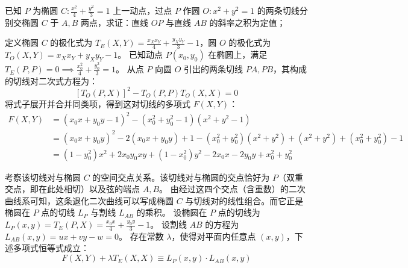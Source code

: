\begin{exercise}
    已知 \(P\) 为椭圆 \(C: \frac{x^2}{4} + \frac{y^2}{3} = 1\) 上一动点，过点 \(P\) 作圆 \(O: x^2 + y^2 = 1\) 的两条切线分别交椭圆 \(C\) 于 \(A,B\) 两点，求证：直线 \(OP\) 与直线 \(AB\) 的斜率之积为定值；
\end{exercise}
\begin{solution}
定义椭圆 $C$ 的极化式为 $T_E(X,Y) = \frac{x_X x_Y}{4} + \frac{y_X y_Y}{3} - 1$，圆 $O$ 的极化式为 $T_O(X,Y) = x_X x_Y + y_X y_Y - 1$。
已知动点 $P(x_0, y_0)$ 在椭圆上，满足 $T_E(P,P) = 0 \implies \frac{x_0^2}{4} + \frac{y_0^2}{3} = 1$。
从点 $P$ 向圆 $O$ 引出的两条切线 $PA, PB$，其构成的切线对二次式方程为：
$$ [T_O(P,X)]^2 - T_O(P,P) T_O(X,X) = 0 $$
将式子展开并合并同类项，得到这对切线的多项式 $F(X,Y)$：
\begin{align*}
F(X,Y) &= (x_0 x + y_0 y - 1)^2 - (x_0^2 + y_0^2 - 1)(x^2 + y^2 - 1) \\
&= (x_0 x + y_0 y)^2 - 2(x_0 x + y_0 y) + 1 - (x_0^2 + y_0^2)(x^2 + y^2) + (x^2 + y^2) + (x_0^2 + y_0^2) - 1 \\
&= (1-y_0^2)x^2 + 2x_0 y_0 xy + (1-x_0^2)y^2 - 2x_0 x - 2y_0 y + x_0^2 + y_0^2
\end{align*}

考察该切线对与椭圆 $C$ 的空间交点关系。该切线对与椭圆的交点恰好为 $P$（双重交点，即在此处相切）以及弦的端点 $A, B$。
由经过这四个交点（含重数）的二次曲线系可知，这条退化二次曲线可以写成椭圆 $C$ 与切线对的线性组合。而它正是椭圆在 $P$ 点的切线 $L_P$ 与割线 $L_{AB}$ 的乘积。
设椭圆在 $P$ 点的切线为 $L_P(x,y) = T_E(P,X) = \frac{x_0 x}{4} + \frac{y_0 y}{3} - 1$。
设割线 $AB$ 的方程为 $L_{AB}(x,y) = ux + vy - w = 0$。
存在常数 $\lambda$，使得对平面内任意点 $(x,y)$，下述多项式恒等式成立：
$$ F(X,Y) + \lambda T_E(X,X) \equiv L_P(x,y) \cdot L_{AB}(x,y) $$


\end{solution}
